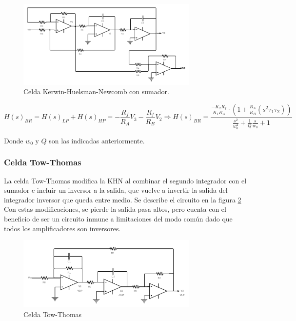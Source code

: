 \begin{figure}[H]
    \centering
    \includegraphics[width= 0.8\textwidth]{../Ejercicio2-DisenoDeCeldas/4CeldaUniversal/Informe/KHN_BR.png}
    \caption{Celda Kerwin-Huelsman-Newcomb con sumador.}
    \label{fig:KHN_BR}
\end{figure}

\begin{equation}
        H(s)_{BR} = H(s)_{LP}+H(s)_{HP} = -\frac{R_{f}}{R_{A}}V_{3} - \frac{R_{f}}{R_{B}}V_{2}
        \Rightarrow 
        H(s)_{BR} = \frac{\frac{- K_{2}R_{f}}{K_{1}R_{A}}\cdot (1+\frac{R_{A}}{R_{B}}(s^{2}\tau_{1}\tau_{2}))}{\frac{s^{2}}{w_{0}^{2}} + \frac{1}{Q} \frac{s}{w_{0}} + 1} 
    \label{eq:KHN8}
\end{equation}


Donde $w_{0}$ y $Q$ son las indicadas anteriormente. 

\subsubsection{Celda Tow-Thomas}

La celda Tow-Thomas modifica la KHN al combinar el segundo integrador con el sumador e incluir un inversor a la  salida,  que vuelve a invertir la salida del integrador inversor que queda entre medio. Se describe el circuito en la figura \ref{fig:TowThomas} Con estas modificaciones, se pierde la salida pasa altos, pero cuenta con el beneficio de ser un circuito inmune a limitaciones del modo común dado que todos los amplificadores son inversores. 

\begin{figure}[H]
    \centering
    \includegraphics[width= 0.8\textwidth]{../Ejercicio2-DisenoDeCeldas/4CeldaUniversal/Informe/TowThomas.png}
    \caption{Celda Tow-Thomas}
    \label{fig:TowThomas}
\end{figure}

